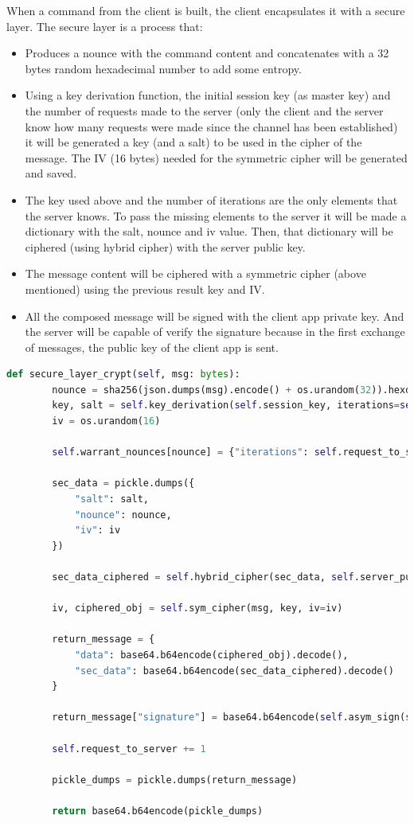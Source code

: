 \documentclass[pdftex,12pt,a4paper]{report}
\begin{document}
When a command from the client is built, the client encapsulates it with a secure layer. The secure layer is a process that:

\begin{itemize}
    \item {
        Produces a nounce with the command content and concatenates with a 32 bytes random hexadecimal number to add some entropy.
    } 
    \item {
        Using a key derivation function, the initial session key (as master key) and the number of requests made to the server (only the client and the server know how many requests were made since the channel has been established) it will be generated a key (and a salt) to be used in the cipher of the message. The IV (16 bytes) needed for the symmetric cipher will be generated and saved.
    }
    \item{
        The key used above and the number of iterations are the only elements that the server knows. To pass the missing elements to the server it will be made a dictionary with the salt, nounce and iv value. Then, that dictionary will be ciphered (using hybrid cipher) with the server public key.
    }
    \item{
        The message content will be ciphered with a symmetric cipher (above mentioned) using the previous result key and IV.
    }
    \item{
        All the composed message will be signed with the client app private key. And the server will be capable of verify the signature because in the first exchange of messages, the public key of the client app is sent.
    }
\end{itemize}


\begin{lstlisting}[language=Python]
    def secure_layer_crypt(self, msg: bytes):
        nounce = sha256(json.dumps(msg).encode() + os.urandom(32)).hexdigest().encode()
        key, salt = self.key_derivation(self.session_key, iterations=self.request_to_server)
        iv = os.urandom(16)

        self.warrant_nounces[nounce] = {"iterations": self.request_to_server, "salt": salt}

        sec_data = pickle.dumps({
            "salt": salt,
            "nounce": nounce,
            "iv": iv
        })

        sec_data_ciphered = self.hybrid_cipher(sec_data, self.server_pub_key)

        iv, ciphered_obj = self.sym_cipher(msg, key, iv=iv)

        return_message = {
            "data": base64.b64encode(ciphered_obj).decode(),
            "sec_data": base64.b64encode(sec_data_ciphered).decode()
        }

        return_message["signature"] = base64.b64encode(self.asym_sign(self.client_app_keys[0], json.dumps(return_message).encode())).decode()

        self.request_to_server += 1

        pickle_dumps = pickle.dumps(return_message)

        return base64.b64encode(pickle_dumps)
\end{lstlisting}
\end{document}
